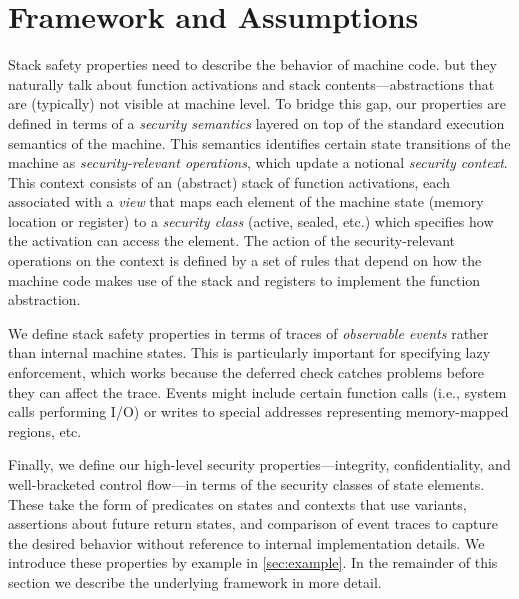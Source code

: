 \documentclass[10pt,conference]{ieeetran}%
\theoremstyle{definition}
\begin{document}

\section{Framework and Assumptions}
\label{sec:ideas}

Stack safety properties need to describe the behavior of machine code. but they naturally 
talk about function activations and stack contents---abstractions that
are (typically) not visible at machine level. To bridge this gap, 
our properties are defined in terms of a {\em security semantics} layered on top of
the standard execution semantics of the machine.  This semantics identifies certain
state transitions of the machine as {\em security-relevant operations}, which update
a notional {\em security context}.  This context consists of
an (abstract) stack of function activations, each associated with a {\em view} 
that maps each element of the machine state (memory location or register)
to a {\em security class} (active, sealed, etc.) which specifies how the activation
can access the element.
The action of the security-relevant operations on the context is defined by a set
of rules that depend on how the machine code makes use of the stack and registers
to implement the function abstraction.

We define stack safety properties in
terms of traces of {\em observable events} rather than internal machine states. 
This is particularly important for
specifying lazy enforcement, which works because the deferred check catches problems 
before they can affect the trace.
Events might include certain function calls (i.e., system calls performing I/O)
or writes to special addresses representing memory-mapped regions, etc.

Finally, we define our high-level security properties---integrity, confidentiality,
and well-bracketed control flow---in terms of the security classes of state
elements. These take the form of predicates on states and contexts that use variants,
assertions about future return states, and comparison of event traces to capture the
desired behavior without reference to internal implementation details.
We introduce these properties by example in \cref{sec:example}. In the remainder
of this section we describe the underlying framework in more detail.
\end{document}
